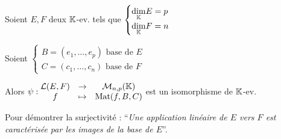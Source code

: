 \documentclass[12pt, a4paper]{report}
\begin{document}
\begin{theorem}
    Soient $E,F$ deux $\mathbb{K}$-ev. tels que $\begin{cases}
    \underset{\mathbb{K}}\dim E = p\\ \underset{\mathbb{K}}\dim F = n
    \end{cases}$

    Soient $\begin{cases}
    B = (e_1,\dots,e_p) \text{ base de } E\\
    C = (c_1,\dots,c_n) \text{ base de } F
    \end{cases}$

    Alors $\psi : \begin{matrix}
    \mathcal{L}(E,F) &\to &\mathcal M_{n,p}(\mathbb{K})\\
    f &\mapsto & \mathrm{Mat}(f,B,C)
    \end{matrix}$ est un isomorphisme de $\mathbb{K}$-ev.
\end{theorem}

\begin{methodbox}
    Pour démontrer la surjectivité : ``\textit{Une application linéaire de $E$ vers $F$ est caractérisée par les images de la base de $E$}''.
\end{methodbox}
\end{document}
